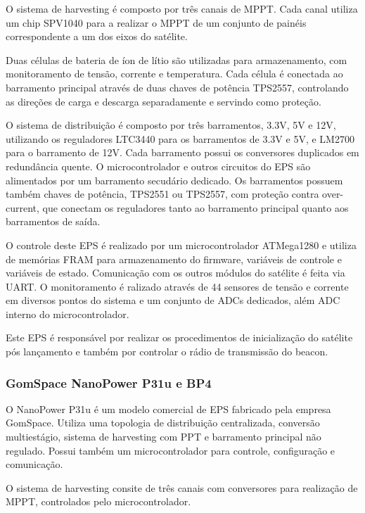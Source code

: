 O sistema de harvesting é composto por três canais de \gls{MPPT}. Cada canal utiliza um chip SPV1040 para a realizar o \gls{MPPT} de um conjunto de painéis correspondente a um dos eixos do satélite.

Duas células de bateria de íon de lítio são utilizadas para armazenamento, com monitoramento de tensão, corrente e temperatura. Cada célula é conectada ao barramento principal através de duas chaves de potência TPS2557, controlando as direções de carga e descarga separadamente e servindo como proteção.

O sistema de distribuição é composto por três barramentos, 3.3V, 5V e 12V, utilizando os reguladores LTC3440 para os barramentos de 3.3V e 5V, e LM2700 para o barramento de 12V.
Cada barramento possui os conversores duplicados em redundância quente.
O microcontrolador e outros circuitos do \gls{EPS} são alimentados por um barramento secudário dedicado.
Os barramentos possuem também chaves de potência, TPS2551 ou TPS2557, com proteção contra over-current, que conectam os reguladores tanto ao barramento principal quanto aos barramentos de saída.

O controle deste \gls{EPS} é realizado por um microcontrolador ATMega1280 e utiliza de memórias FRAM para armazenamento do firmware, variáveis de controle e variáveis de estado.
Comunicação com os outros módulos do satélite é feita via \gls{UART}.
O monitoramento é ralizado através de 44 sensores de tensão e corrente em diversos pontos do sistema e um conjunto de ADCs dedicados, além ADC interno do microcontrolador.

Este \gls{EPS} é responsável por realizar os procedimentos de inicialização do satélite pós lançamento e também por controlar o rádio de transmissão do beacon.




\subsubsection{GomSpace NanoPower P31u e BP4}

O NanoPower P31u \cite{p31u-datasheet} é um modelo comercial de \gls{EPS} fabricado pela empresa GomSpace. Utiliza uma topologia de distribuição centralizada, conversão multiestágio, sistema de harvesting com \gls{PPT} e barramento principal não regulado. Possui também um microcontrolador para controle, configuração e comunicação.

O sistema de harvesting consite de três canais com conversores para realização de \gls{MPPT}, controlados pelo microcontrolador.


